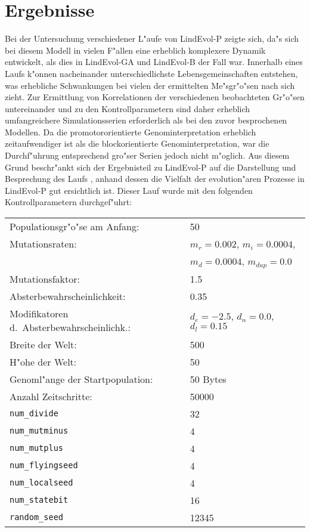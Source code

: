 \section{Ergebnisse}
\label{lnd5-results}

Bei der Untersuchung verschiedener L"aufe von LindEvol-P zeigte sich, da"s sich bei diesem Modell in vielen
F"allen eine erheblich komplexere Dynamik entwickelt, als dies in LindEvol-GA und LindEvol-B der Fall war.
Innerhalb eines Laufs k"onnen nacheinander unterschiedlichste Lebensgemeinschaften entstehen, was erhebliche
Schwankungen bei vielen der ermittelten Me"sgr"o"sen nach sich zieht. Zur Ermittlung von Korrelationen der verschiedenen
beobachteten Gr"o"sen untereinander und zu den Kontrollparametern sind daher erheblich umfangreichere Simulationsserien
erforderlich als bei den zuvor besprochenen Modellen. Da
die promotororientierte Genominterpretation erheblich zeitaufwendiger ist als die blockorientierte Genominterpretation,
war die Durchf"uhrung entsprechend gro"ser Serien jedoch nicht m"oglich. Aus diesem Grund beschr"ankt sich der
Ergebnisteil zu LindEvol-P auf die Darstellung und Besprechung des Laufs , anhand dessen die
Vielfalt der evolution"aren Prozesse in LindEvol-P gut ersichtlich ist.
Dieser Lauf wurde mit den folgenden Kontrollparametern durchgef"uhrt:

\medskip
\begin{tabular}{ll}
Populationsgr"o"se am Anfang: & 50 \\
Mutationsraten: & $m_r=0.002$, $m_i=0.0004$, \\
		& $m_d=0.0004$, $m_{\mathit{dup}}=0.0$ \\
Mutationsfaktor: & 1.5 \\
Absterbewahrscheinlichkeit: & 0.35 \\
Modifikatoren d.\ Absterbewahrscheinlichk.: & $d_e=-2.5$, $d_n=0.0$, $d_l=0.15$ \\
Breite der Welt: & 500 \\
H"ohe der Welt: & 50  \\
Genoml"ange der Startpopulation: & 50 Bytes \\
Anzahl Zeitschritte:             & 50000 \\
\verb|num_divide| & 32 \\
\verb|num_mutminus| & 4 \\
\verb|num_mutplus| & 4 \\
\verb|num_flyingseed| & 4 \\
\verb|num_localseed| & 4 \\
\verb|num_statebit| & 16 \\
\verb|random_seed| & 12345 \\
\end{tabular}
\medskip

